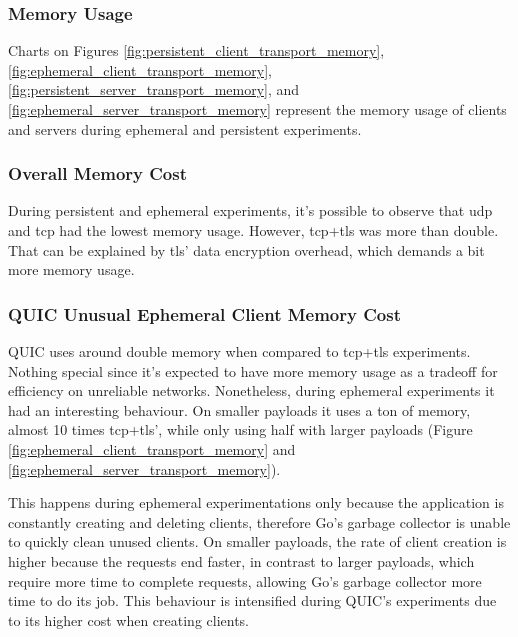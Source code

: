 \subsubsection{Memory Usage}

Charts on Figures \ref{fig:persistent_client_transport_memory}, \ref{fig:ephemeral_client_transport_memory}, \ref{fig:persistent_server_transport_memory}, and \ref{fig:ephemeral_server_transport_memory} represent the memory usage of clients and servers during ephemeral and persistent experiments.

\subsubsection*{Overall Memory Cost}

During persistent and ephemeral experiments, it’s possible to observe that \gls{udp} and \gls{tcp} had the lowest memory usage. However, \gls{tcp}+\gls{tls} was more than double. That can be explained by \gls{tls}’ data encryption overhead, which demands a bit more memory usage.

\subsubsection*{QUIC Unusual Ephemeral Client Memory Cost}

QUIC uses around double memory when compared to \gls{tcp}+\gls{tls} experiments. Nothing special since it’s expected to have more memory usage as a tradeoff for efficiency on unreliable networks. Nonetheless, during ephemeral experiments it had an interesting behaviour. On smaller payloads it uses a ton of memory, almost 10 times \gls{tcp}+\gls{tls}’, while only using half with larger payloads (Figure \ref{fig:ephemeral_client_transport_memory} and \ref{fig:ephemeral_server_transport_memory}).

This happens during ephemeral experimentations only because the application is constantly creating and deleting clients, therefore Go’s garbage collector is unable to quickly clean unused clients. On smaller payloads, the rate of client creation is higher because the requests end faster, in contrast to larger payloads, which require more time to complete requests, allowing Go’s garbage collector more time to do its job. This behaviour is intensified during QUIC’s experiments due to its higher cost when creating clients.

\clearpage

